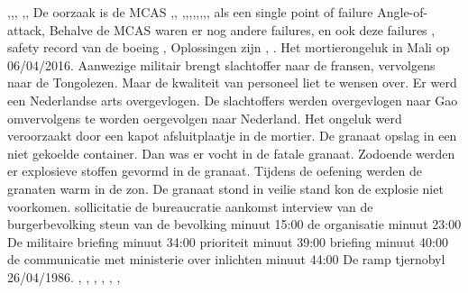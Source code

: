 \cite{boeing737maxsoftwareprobles},\cite{avetisov19032019boeingmalwarestate},\cite{thompson23112020nationalsecurityboeing},
\cite{wiki737maxgroundings},\cite{campbell02052019boengcrashhumanerrors},
De oorzaak is de MCAS
\cite{hawkins22032019737maxairplanes},\cite{barnett05052019737maxcrisis}, \cite{thomas30082020737safest},\cite{boyle18112020737maxupgrade},\cite{bergstraburgess122019737maxMcasAlgorithm},\cite{737mcas},\cite{german190620217372yaftergrounded},\cite{beningo02052019boeinglessons},\cite{bloomberg26092019failedpred},\cite{afacwaLostSafeguards}, als een single point of failure \cite{uran05042019SPOF}
Angle-of-attack\cite{boeing737maxdisplay},
Behalve de MCAS waren er nog andere failures\cite{fehrm24112020737changes}, en ook deze failures \cite{dohertylindeman15032019737problems}
\cite{travis18042019737maxsoftwaredevop},
safety record van de boeing
\cite{touitou11032019737tragedies},
 Oplossingen zijn \cite{caa737modifications},
. 
Het mortierongeluk in Mali op 06/04/2016. Aanwezige militair brengt slachtoffer naar de fransen, vervolgens naar de Tongolezen. Maar de kwaliteit van personeel liet te wensen over.
Er werd een Nederlandse arts overgevlogen. De slachtoffers werden overgevlogen naar Gao omvervolgens te worden oergevolgen naar Nederland.
Het ongeluk werd veroorzaakt door een kapot afsluitplaatje in de mortier. De granaat opslag in een niet gekoelde container. Dan was er vocht in de fatale granaat. Zodoende werden er explosieve stoffen gevormd in de granaat.
Tijdens de oefening werden de granaten warm in de zon. De granaat stond in veilie stand kon de explosie niet voorkomen.	\cite{ovvMortierOngevalMaliVideo} 
\cite{bnnvara13062018malirapport}
\cite{eucal11012021malimissieverlengd}
\cite{nos21052014zorgenmalimissie}
\cite{meijnders}
\cite{bnrwebredactie}
\cite{keultjes01062016malimissiecoalitie}
\cite{veenhof18012019}
\cite{isitman06012016militair}
\cite{nporadio11072016filmdemissie}
\cite{parlementairmonitor15122013mortierongeluk}
sollicitatie
de bureaucratie
aankomst
interview van de burgerbevolking
steun van de bevolking minuut 15:00
de organisatie minuut 23:00
De militaire briefing minuut 34:00
prioriteit minuut 39:00
briefing minuut 40:00
de communicatie met ministerie over inlichten minuut 44:00
\cite{DemissieFilm} De ramp tjernobyl 26/04/1986. \cite{INSAVienna1992Chernobyl}
\cite{wikiTjernobyl},
\cite{rivmTjernobyl},
\cite{andereTijdenTjernobyl},
\cite{kingskey19042022tjernobyl},
\cite{erikbork26042023reactor4},
\cite{nosTjernobyl30jaarlater},
